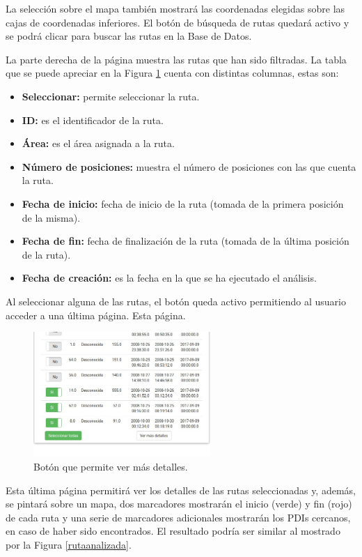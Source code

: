 La selección sobre el mapa también mostrará las coordenadas elegidas sobre las cajas de coordenadas inferiores. El botón de búsqueda de rutas quedará activo y se podrá clicar para buscar las rutas en la Base de Datos.

La parte derecha de la página muestra las rutas que han sido filtradas. La tabla que se puede apreciar en la Figura \ref{vermas} cuenta con distintas columnas, estas son:

\begin{itemize}
	\item \textbf{Seleccionar:} permite seleccionar la ruta.
	\item \textbf{ID:} es el identificador de la ruta.
	\item \textbf{Área:} es el área asignada a la ruta.
	\item \textbf{Número de posiciones:} muestra el número de posiciones con las que cuenta la ruta.
	\item \textbf{Fecha de inicio:} fecha de inicio de la ruta (tomada de la primera posición de la misma).
	\item \textbf{Fecha de fin:} fecha de finalización de la ruta (tomada de la última posición de la ruta).
	\item \textbf{Fecha de creación:} es la fecha en la que se ha ejecutado el análisis.
\end{itemize}

Al seleccionar alguna de las rutas, el botón  queda activo permitiendo al usuario acceder a una última página. Esta página.

\begin{figure}[h]
  \centering
    \includegraphics[width=0.6\textwidth]{../img/manualusuario/vermas.jpg}
  \caption{Botón que permite ver más detalles.}
  \label{vermas}
\end{figure}

Esta última página permitirá ver los detalles de las rutas seleccionadas y, además, se pintará sobre un mapa, dos marcadores mostrarán el inicio (verde) y fin (rojo) de cada ruta y una serie de marcadores adicionales mostrarán los PDIs cercanos, en caso de haber sido encontrados. El resultado podría ser similar al mostrado por la Figura \ref{rutaanalizada}.

